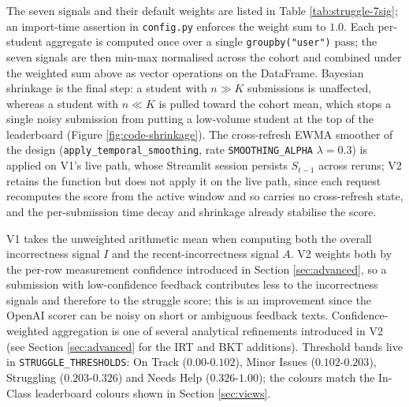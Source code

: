 The seven signals and their default weights are listed in Table \ref{tab:struggle-7sig}; an import-time assertion in \texttt{config.py} enforces the weight sum to $1.0$.
Each per-student aggregate is computed once over a single \texttt{groupby("user")} pass; the seven signals are then min-max normalised across the cohort and combined under the weighted sum above as vector operations on the DataFrame.
Bayesian shrinkage is the final step: a student with $n \gg K$ submissions is unaffected, whereas a student with $n \ll K$ is pulled toward the cohort mean, which stops a single noisy submission from putting a low-volume student at the top of the leaderboard (Figure \ref{fig:code-shrinkage}).
The cross-refresh EWMA smoother of the design (\texttt{apply\_temporal\_smoothing}, rate \texttt{SMOOTHING\_ALPHA} $\lambda = 0.3$) is applied on V1's live path, whose Streamlit session persists $S_{t-1}$ across reruns; V2 retains the function but does not apply it on the live path, since each request recomputes the score from the active window and so carries no cross-refresh state, and the per-submission time decay and shrinkage already stabilise the score.

V1 takes the unweighted arithmetic mean when computing both the overall incorrectness signal $I$ and the recent-incorrectness signal $A$.
V2 weights both by the per-row measurement confidence introduced in Section \ref{sec:advanced}, so a submission with low-confidence feedback contributes less to the incorrectness signals and therefore to the struggle score; this is an improvement since the OpenAI scorer can be noisy on short or ambiguous feedback texts.
Confidence-weighted aggregation is one of several analytical refinements introduced in V2 (see Section \ref{sec:advanced} for the IRT and BKT additions).
Threshold bands live in \texttt{STRUGGLE\_THRESHOLDS}: On Track ($0.00$-$0.102$), Minor Issues ($0.102$-$0.203$), Struggling ($0.203$-$0.326$) and Needs Help ($0.326$-$1.00$); the colours match the In-Class leaderboard colours shown in Section \ref{sec:views}.\label{sec:thresholds-struggle}


